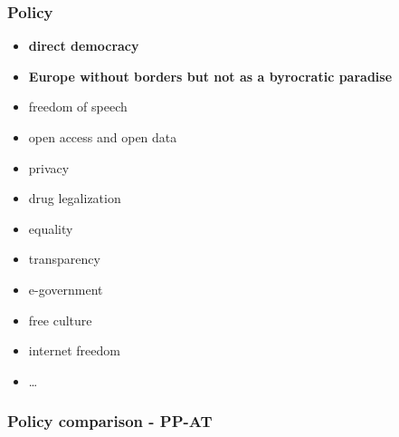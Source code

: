 \begin{frame}
	\frametitle{Policy}
	\begin{itemize}
		\item \textbf{direct democracy}
		\item \textbf{Europe without borders but not as a byrocratic paradise}
		\item freedom of speech
		\item open access and open data
		\item privacy
		\item drug legalization
		\item equality
		\item transparency
		\item e-government
		\item free culture
		\item internet freedom
		\item \dots
	\end{itemize}

\end{frame}
\begin{frame}
	\frametitle{Policy comparison - PP-AT}
\end{frame}

